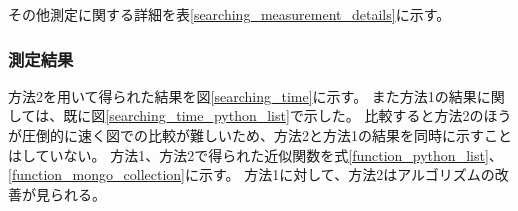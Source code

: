 その他測定に関する詳細を表\ref{searching_measurement_details}に示す。

\begin{table}[tbp]
\begin{center}
\caption[検索機能処理時間測定の詳細]{検索機能処理時間測定の詳細。測定を行った試験結果数、回数、キーワード、検索モード、検索情報の詳細を示している。}
\label{searching_measurement_details}
\end{center}
\end{table}

\subsubsection{測定結果}

方法2を用いて得られた結果を図\ref{searching_time}に示す。
また方法1の結果に関しては、既に図\ref{searching_time_python_list}で示した。
比較すると方法2のほうが圧倒的に速く図での比較が難しいため、方法2と方法1の結果を同時に示すことはしていない。
方法1、方法2で得られた近似関数を式\ref{function_python_list}、\ref{function_mongo_collection}に示す。
方法1に対して、方法2はアルゴリズムの改善が見られる。

